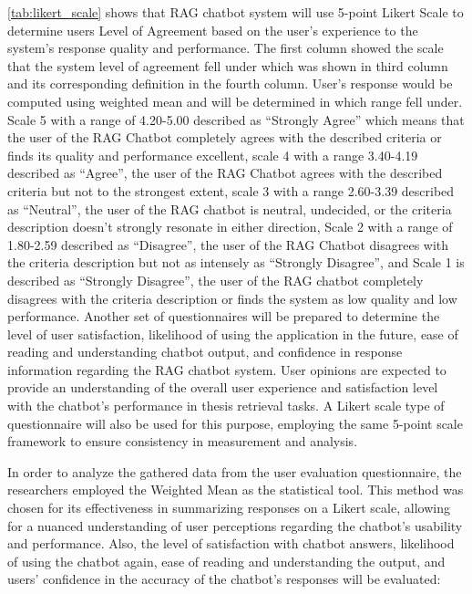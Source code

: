 \begin{refsection}
\ref{tab:likert_scale} shows that RAG chatbot system will use 5-point Likert Scale to determine users Level of Agreement based on the user’s experience to the system’s response quality and performance. The first column showed the scale that the system level of agreement fell under which was shown in third column and its corresponding definition in the fourth column. User’s response would be computed using weighted mean and will be determined in which range fell under. Scale 5 with a range of 4.20-5.00 described as “Strongly Agree” which means that the user of the RAG Chatbot completely agrees with the described criteria or finds its quality and performance excellent, scale 4 with a range 3.40-4.19 described as “Agree”, the user of the RAG Chatbot agrees with the described criteria but not to the strongest extent, scale 3 with a range 2.60-3.39 described as “Neutral”, the user of the RAG chatbot is neutral, undecided, or the  criteria description doesn’t strongly resonate in either direction, Scale 2 with a range of 1.80-2.59 described as “Disagree”, the user of the RAG Chatbot disagrees with the criteria description but not as intensely as “Strongly Disagree”, and Scale 1 is described as “Strongly Disagree”, the user of the RAG chatbot completely disagrees with the criteria description or finds the system as low quality and low performance. Another set of questionnaires will be prepared to determine the level of user satisfaction, likelihood of using the application in the future, ease of reading and understanding chatbot output, and confidence in response information regarding the RAG chatbot system. User opinions are expected to provide an understanding of the overall user experience and satisfaction level with the chatbot's performance in thesis retrieval tasks. A Likert scale type of questionnaire will also be used for this purpose, employing the same 5-point scale framework to ensure consistency in measurement and analysis.

In order to analyze the gathered data from the user evaluation questionnaire, the researchers employed the Weighted Mean as the statistical tool. This method was chosen for its effectiveness in summarizing responses on a Likert scale, allowing for a nuanced understanding of user perceptions regarding the chatbot's usability and performance. Also, the level of satisfaction with chatbot answers, likelihood of using the chatbot again, ease of reading and understanding the output, and users’ confidence in the accuracy of the chatbot’s responses will be evaluated:


\end{refsection}
